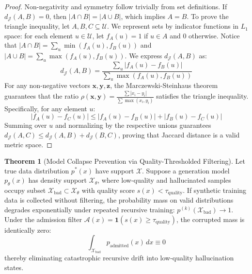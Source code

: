 \documentclass[11pt,a4paper]{article}
\theoremstyle{definition}
\newtheorem{theorem}{\textbf{Theorem}}[section]
\begin{document}
\begin{proof}
Non-negativity and symmetry follow trivially from set definitions. If $d_{\mathcal{J}}(A, B) = 0$, then $|A \cap B| = |A \cup B|$, which implies $A = B$.
To prove the triangle inequality, let $A, B, C \subseteq \mathcal{U}$. We represent sets by indicator functions in $L_1$ space: for each element $u \in \mathcal{U}$, let $f_A(u) = 1$ if $u \in A$ and $0$ otherwise.
Notice that $|A \cap B| = \sum_{u} \min(f_A(u), f_B(u))$ and $|A \cup B| = \sum_{u} \max(f_A(u), f_B(u))$.
We express $d_{\mathcal{J}}(A, B)$ as:
\begin{equation}
d_{\mathcal{J}}(A, B) = \frac{\sum_{u} |f_A(u) - f_B(u)|}{\sum_u \max(f_A(u), f_B(u))}
\end{equation}
For any non-negative vectors $\mathbf{x}, \mathbf{y}, \mathbf{z}$, the Marczewski-Steinhaus theorem guarantees that the ratio $\rho(\mathbf{x}, \mathbf{y}) = \frac{\sum |x_i - y_i|}{\sum \max(x_i, y_i)}$ satisfies the triangle inequality.
Specifically, for any element $u$:
\begin{equation}
|f_A(u) - f_C(u)| \le |f_A(u) - f_B(u)| + |f_B(u) - f_C(u)|
\end{equation}
Summing over $u$ and normalizing by the respective unions guarantees $d_{\mathcal{J}}(A, C) \le d_{\mathcal{J}}(A, B) + d_{\mathcal{J}}(B, C)$, proving that Jaccard distance is a valid metric space.
\end{proof}

\begin{theorem}[Model Collapse Prevention via Quality-Thresholded Filtering]
Let true data distribution $p^*(x)$ have support $\mathcal{X}$. Suppose a generation model $p_\theta(x)$ has density support $\mathcal{X}_\theta$, where low-quality and hallucinated samples occupy subset $\mathcal{X}_{\text{bad}} \subset \mathcal{X}_\theta$ with quality score $s(x) < \tau_{\text{quality}}$. If synthetic training data is collected without filtering, the probability mass on valid distributions degrades exponentially under repeated recursive training: $p^{(k)}(\mathcal{X}_{\text{bad}}) \to 1$.
Under the admission filter $\mathcal{A}(x) = \mathbf{1}(s(x) \ge \tau_{\text{quality}})$, the corrupted mass is identically zero:
{\boldmath
\begin{equation}
\int_{\mathcal{X}_{\text{bad}}} p_{\text{admitted}}(x) \, dx \equiv 0
\end{equation}
}
thereby eliminating catastrophic recursive drift into low-quality hallucination states.
\end{theorem}
\end{document}
